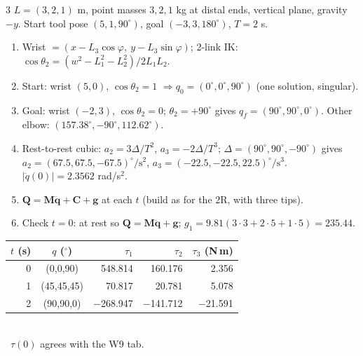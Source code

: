 \begin{multicols}{3}
$L=(3,2,1)$ m, point masses $3,2,1$ kg at distal ends, vertical plane, gravity $-y$. Start tool pose $(5,1,90^\circ)$, goal $(-3,3,180^\circ)$, $T=2$ s.
\begin{recipe}
\label{w7:cubic}
\begin{enumerate}
\item Wrist $=(x-L_3\cos\varphi,\ y-L_3\sin\varphi)$; 2-link IK: $\cos\theta_2=(w^2-L_1^2-L_2^2)/2L_1L_2$.
\item Start: wrist $(5,0)$, $\cos\theta_2=1$ $\Rightarrow q_0=(0^\circ,0^\circ,90^\circ)$ (one solution, singular).
\item Goal: wrist $(-2,3)$, $\cos\theta_2=0$; $\theta_2=+90^\circ$ gives $q_f=(90^\circ,90^\circ,0^\circ)$. Other elbow: $(157.38^\circ,-90^\circ,112.62^\circ)$.
\item Rest-to-rest cubic: $a_2=3\Delta/T^2$, $a_3=-2\Delta/T^3$; $\Delta=(90^\circ,90^\circ,-90^\circ)$ gives $a_2=(67.5,67.5,-67.5)^\circ/\text{s}^2$, $a_3=(-22.5,-22.5,22.5)^\circ/\text{s}^3$. $|\ddot q(0)|=2.3562$ rad/s$^2$.
\item $\mathbf Q=\mathbf M\ddot{\mathbf q}+\mathbf C+\mathbf g$ at each $t$ (build as for the 2R, with three tips).
\item Check $t=0$: at rest so $\mathbf Q=\mathbf M\ddot{\mathbf q}+\mathbf g$; $g_1=9.81(3\cdot3+2\cdot5+1\cdot5)=235.44$.
\end{enumerate}
\end{recipe}
\begin{tabular}{@{}rcrrr@{}}\toprule
$t$ (s) & $q$ ($^\circ$) & $\tau_1$ & $\tau_2$ & $\tau_3$ (N\,m)\\\midrule
0 & (0,0,90) & 548.814 & 160.176 & 2.356\\
1 & (45,45,45) & 70.817 & 20.781 & 5.078\\
2 & (90,90,0) & $-$268.947 & $-$141.712 & $-$21.591\\\bottomrule
\end{tabular}\\
\chk\ $\tau(0)$ agrees with the W9 tab.


\end{multicols}
